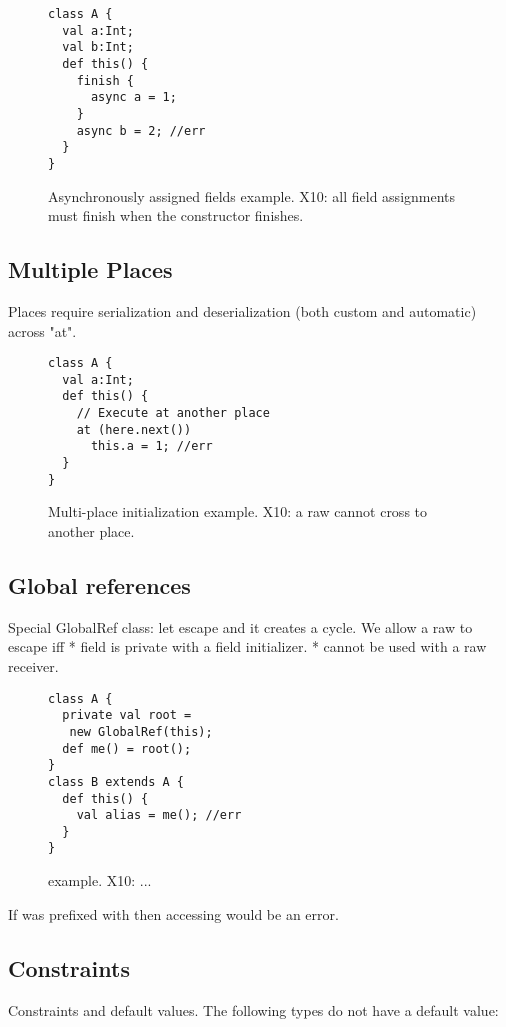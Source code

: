 \begin{figure}
\begin{lstlisting}
class A {
  val a:Int;
  val b:Int;
  def this() {
    finish {
      async a = 1;
    }
    async b = 2; //err
  }
}
\end{lstlisting}
\caption{Asynchronously assigned fields example.
    X10: all field assignments must finish when the constructor finishes.}
\label{Figure:Asynchronously-init}
\end{figure}


\subsection{Multiple Places}
Places require serialization and deserialization (both custom and automatic) across "at".

\begin{figure}
\begin{lstlisting}
class A {
  val a:Int;
  def this() {
    // Execute at another place
    at (here.next())
      this.a = 1; //err
  }
}
\end{lstlisting}
\caption{Multi-place initialization example.
    X10: a raw \this cannot cross to another place.}
\label{Figure:Multi-place}
\end{figure}


\subsection{Global references}
Special GlobalRef class: let \this escape and it creates a cycle.
We allow a raw \this to escape iff
* field is private with a field initializer.
* cannot be used with a raw \this receiver.

\begin{figure}
\begin{lstlisting}
class A {
  private val root =
   new GlobalRef(this);
  def me() = root();
}
class B extends A {
  def this() {
    val alias = me(); //err
  }
}
\end{lstlisting}
\caption{ example.
    X10: ...}
\label{Figure:GlobalRef}
\end{figure}

If  was prefixed with
then accessing  would be an error.

\subsection{Constraints}
Constraints and default values.
The following types do not have a default value:

